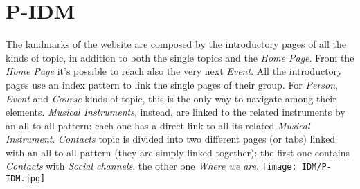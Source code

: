 \documentclass[../../DD.tex]{subfiles}
\begin{document}
\section{P-IDM \label{sect:2.1}}
	The landmarks of the website are composed by the introductory pages of all the kinds of topic, in addition to both the single topics and the \textit{Home Page}. From the \textit{Home Page} it's possible to reach also the very next \textit{Event}.
	\newline
	All the introductory pages use an index pattern to link the single pages of their group. For \textit{Person}, \textit{Event} and \textit{Course} kinds of topic, this is the only way to navigate among their elements. \textit{Musical Instruments}, instead, are linked to the related instruments by an all-to-all pattern: each one has a direct link to all its related \textit{Musical Instrument}.
	\newline
	\textit{Contacts} topic is divided into two different pages (or tabs) linked with an all-to-all pattern (they are simply linked together): the first one contains \textit{Contacts} with \textit{Social channels}, the other one \textit{Where we are}.
	\newline
	\texttt{[image: IDM/P-IDM.jpg]}
\end{document}
